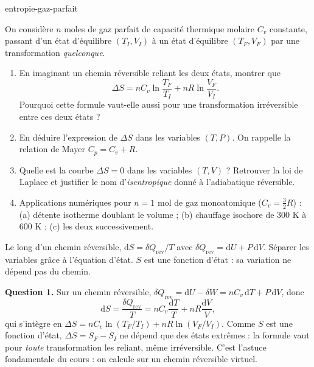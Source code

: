 
\begin{exo}{entropie-gaz-parfait}

On considère $n$ moles de gaz parfait de capacité thermique molaire $C_v$ constante, passant d'un état d'équilibre $(T_I, V_I)$ à un état d'équilibre $(T_F, V_F)$ par une transformation \emph{quelconque}.

\begin{enumerate}
\item En imaginant un chemin réversible reliant les deux états, montrer que
\[
\Delta S = nC_v\ln\frac{T_F}{T_I} + nR\ln\frac{V_F}{V_I}.
\]
Pourquoi cette formule vaut-elle aussi pour une transformation irréversible entre ces deux états ?
\item En déduire l'expression de $\Delta S$ dans les variables $(T,P)$. On rappelle la relation de Mayer $C_p = C_v + R$.
\item Quelle est la courbe $\Delta S = 0$ dans les variables $(T,V)$ ? Retrouver la loi de Laplace et justifier le nom d'\emph{isentropique} donné à l'adiabatique réversible.
\item Applications numériques pour $n = 1$ mol de gaz monoatomique ($C_v = \frac{3}{2}R$) : (a) détente isotherme doublant le volume ; (b) chauffage isochore de 300 K à 600 K ; (c) les deux successivement.
\end{enumerate}

\begin{indication}
Le long d'un chemin réversible, $\mathrm{d}S = \delta Q_{\text{rev}}/T$ avec $\delta Q_{\text{rev}} = \mathrm{d}U + P\,\mathrm{d}V$. Séparer les variables grâce à l'équation d'état. $S$ est une fonction d'état : sa variation ne dépend pas du chemin.
\end{indication}

\begin{solution}
\textbf{Question 1.} Sur un chemin réversible, $\delta Q_{\text{rev}} = \mathrm{d}U - \delta W = nC_v\,\mathrm{d}T + P\,\mathrm{d}V$, donc
\[
\mathrm{d}S = \frac{\delta Q_{\text{rev}}}{T} = nC_v\frac{\mathrm{d}T}{T} + nR\frac{\mathrm{d}V}{V},
\]
qui s'intègre en $\Delta S = nC_v\ln(T_F/T_I) + nR\ln(V_F/V_I)$. Comme $S$ est une fonction d'état, $\Delta S = S_F - S_I$ ne dépend que des états extrêmes : la formule vaut pour \emph{toute} transformation les reliant, même irréversible. C'est l'astuce fondamentale du cours : on calcule sur un chemin réversible virtuel.


\end{solution}
\end{exo}
